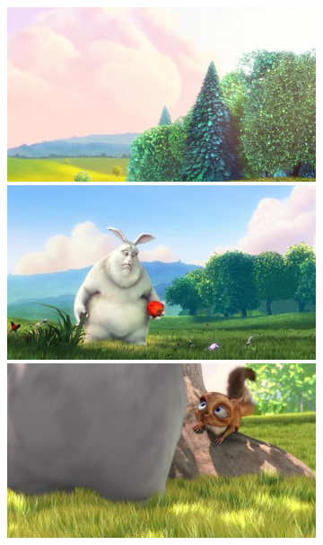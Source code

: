 \begin{figure}
	\centering
	\begin{subfigure}[t]{0.135\textwidth}
		\includegraphics[width=\textwidth]{figures/stereo/bbb_frame-0004-0}\\
		\includegraphics[width=\textwidth]{figures/stereo/bbb_frame-0092-0}\\
		\includegraphics[width=\textwidth]{figures/stereo/bbb_frame-0124-0}\\

\end{subfigure}
\end{figure}
